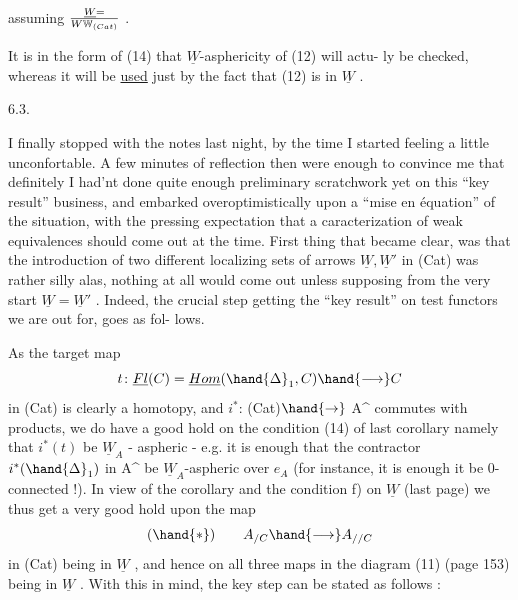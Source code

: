 assuming $\underline{W} = \over{W}{\mathbb{W}}_{(Cat)}$ .

It is in the form of (14) that  $\underline{W}$-asphericity of (12) will actu-%
ly be checked, whereas it will be \uline{used} just by the fact that (12) is in
$\underline{W}$ .

6.3.

 I finally stopped with the notes last night,  by the time  I
started feeling a little unconfortable. A few minutes of reflection then
were enough to convince me that definitely I had'nt done quite enough
preliminary scratchwork yet on this ``key result'' business, and embarked
overoptimistically upon a ``mise en équation'' of the situation, with the
pressing expectation that a caracterization of weak equivalences should
come out at the  time. First thing that became clear, was that
the introduction of two different localizing sets of arrows $\underline{W},\underline{W}'$ in (Cat)
was rather silly alas, nothing at all would come out unless supposing
from the very start $\underline{W} = \underline{W}'$ . Indeed, the crucial step  
getting the ``key result'' on test functors we are out for, goes as fol-%
lows.

As the target map
\[ t\colon \underline{Fl}(C) = \underline{Hom}(\hand{\Delta}_1,C) \hand{\longrightarrow} C \]
in (Cat) is clearly a homotopy, and $i^*$: (Cat)$\hand{\to}$ A\^{} commutes with
products, we do have a good hold on the condition (14) of last corollary\hand{,}
namely that $i^*(t)$ be $\underline{W}_A$ - aspheric - e.g. it is enough that the
contractor $i^*(\hand{\Delta}_1)$ in A\^{} be $\underline{W}_A$-aspheric over $e_{A\hat{}}$ (for instance, it is 
enough it be 0-connected !). In view of the corollary and the condition
f) on $\underline{W}$ (last page)\hand{,} we thus get a very good hold upon the  map
\[ (\hand{*}) \qquad A_{/C} \hand{\longrightarrow} A_{//C} \]
in (Cat) being in $\underline{W}$ , and hence on all three maps in the diagram (11)
(page 153) being in $\underline{W}$ . With this in mind, the key step can be stated
as follows :

